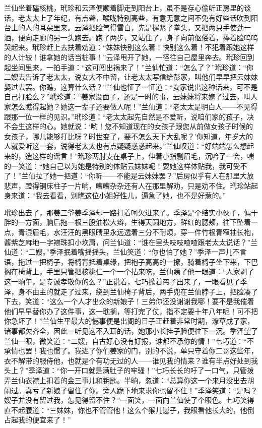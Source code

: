 \par 兰仙坐着磕核桃，玳珍和云泽便顺着脚走到阳台上，虽不是存心偷听正房里的谈话，老太太上了年纪，有点聋，喉咙特别高些，有意无意之间不免有好些话吹到阳台上的人的耳朵里来。云泽把脸气得雪白，先是握紧了拳头，又把两只手使劲一洒，便向走廊的另一头跑去。跑了两步，又站住了，身子向前伛偻着，捧着脸呜呜哭起来。玳珍赶上去扶着劝道：“妹妹快别这么着！快别这么着！不犯着跟她这样的人计较！谁拿她的话当桩事！”云泽甩开了她，一径往自己屋里奔去。玳珍回到起坐间里来，一拍手道：“这可闯出祸来了！”兰仙忙道：“怎么了？”玳珍道：“你二嫂去告诉了老太太，说女大不中留，让老太太写信给彭家，叫他们早早把云妹妹娶过去罢。你瞧，这算什么话？”兰仙也怔了一怔道：“女家说出这种话来，可不是自己打脸么？”玳珍道：“姜家没面子，还是一时的事，云妹妹将来嫁了过去，叫人家怎么瞧得起她？她这一辈子还要做人呢！”兰仙道：“老太太是明白人——不见得跟那一位一样的见识。”玳珍道：“老太太起先自然是不爱听，说咱们家的孩子，决不会生这样的心。她就说：‘哟！您不知道现在的女孩子跟您从前做女孩子时候的女孩子，哪儿能够打比呀？时世变了，要不怎么天下大乱呢？’你知道，年岁大的人就爱听这一套，说得老太太也有点疑疑惑惑起来。”兰仙叹道：“好端端怎么想起来的，造这样的谣言！”玳珍两肘支在桌子上，伸着小指剔眉毛，沉吟了一会，嗤的一笑道：“她自己以为她是特别的体贴云妹妹呢！要她这样体贴我，我可受不了！”兰仙拉了她一把道：“你听——不能是云妹妹罢？”后房似乎有人在那里大放悲声，蹬得铜床柱子一片响，嘈嘈杂杂还有人在那里解劝，只是劝不住。玳珍站起身来道：“我去看看，别瞧这位小姐好性儿，逼急了她，也不是好惹的。”
\par 玳珍出去了，那姜三爷姜季泽却一路打着呵欠进来了。季泽是个结实小伙子，偏于胖的一方面，脑后拖一根三股油松大辫，生得天圆地方，鲜红的腮颊，往下坠着一点，青湿眉毛，水汪汪的黑眼睛里永远透着三分不耐烦，穿一件竹根青窄袖长袍，酱紫芝麻地一字襟珠扣小坎肩，问兰仙道：“谁在里头吱吱喳喳跟老太太说话？”兰仙道：“二嫂。”季泽抿着嘴摇摇头，兰仙笑道：“你也怕了她？”季泽一声儿不言语，拖过一把椅子，将椅背抵着桌缘，把袍子高高的一撩，骑着椅子坐下来，下巴搁在椅背上，手里只管把核桃仁一个一个拈来吃，兰仙眱了他一眼道：“人家剥了这一晌午，是专诚孝敬你的么？”正说着，七巧掀着帘子出来了，一眼看见了季泽，身不由主的就走了过来，绕到兰仙椅子背后，两手兜在兰仙脖子上，把脸凑了下去，笑道：“这么一个人才出众的新娘子！三弟你还没谢谢我哪！要不是我催着他们早早替你办了这件事，这一耽搁，等打完了仗，指不定要十年八年呢！可不把你急坏了！”兰仙生平最大的憾事便是出阁的日子正赶着非常时期，潦草成了家，诸事都欠齐全，因此一听见这不入耳的话，她那小长挂子脸便往下一沉。季泽望了兰仙一眼，微笑道：“二嫂，自古好心没有好报，谁都不承你的情！”七巧道：“不承情也罢！我也惯了。我进了你们姜家的门，别的不说，单只守着你二哥这些年，衣不解带的服侍他，也就是个有功无过的人——谁见我的情来？谁有半点好处到我头上？”季泽道：“你一开口就是满肚子的牢骚！”七巧长长的吁了一口气，只管拨弄兰仙衣襟上扣着的金三事儿和钥匙。半晌，忽道：“总算你这一个来月没出去胡闹过。真亏了新娘子留住了你。旁人跪下地来求你也留不住！”季泽笑道：“是吗？嫂子并没有留过我，怎见得留不住？”一面笑，一面向兰仙使了个眼色。七巧笑得直不起腰道：“三妹妹，你也不管管他！这么个猴儿崽子，我眼看他长大的，他倒占起我的便宜来了！”
